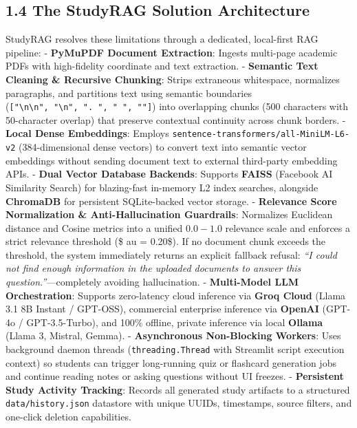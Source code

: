 \documentclass[
]{article}
\begin{document}
\subsection{1.4 The StudyRAG Solution
Architecture}\label{the-studyrag-solution-architecture}

StudyRAG resolves these limitations through a dedicated, local-first RAG
pipeline: - \textbf{PyMuPDF Document Extraction}: Ingests multi-page
academic PDFs with high-fidelity coordinate and text extraction. -
\textbf{Semantic Text Cleaning \& Recursive Chunking}: Strips extraneous
whitespace, normalizes paragraphs, and partitions text using semantic
boundaries
(\texttt{{[}"\textbackslash{}n\textbackslash{}n",\allowbreak \ \allowbreak "\textbackslash{}n",\allowbreak \ \allowbreak ".\ \allowbreak ",\allowbreak \ \allowbreak "\ \allowbreak ",\allowbreak \ \allowbreak ""{]}})
into overlapping chunks (500 characters with 50-character overlap) that
preserve contextual continuity across chunk borders. - \textbf{Local
Dense Embeddings}: Employs
\texttt{sentence-transformers/\allowbreak all-MiniLM-L6-v2} (384-dimensional dense
vectors) to convert text into semantic vector embeddings without sending
document text to external third-party embedding APIs. - \textbf{Dual
Vector Database Backends}: Supports \textbf{FAISS} (Facebook AI
Similarity Search) for blazing-fast in-memory L2 index searches,
alongside \textbf{ChromaDB} for persistent SQLite-backed vector storage.
- \textbf{Relevance Score Normalization \& Anti-Hallucination
Guardrails}: Normalizes Euclidean distance and Cosine metrics into a
unified \(0.0 - 1.0\) relevance scale and enforces a strict relevance
threshold (\$ au = 0.20\$). If no document chunk exceeds the threshold,
the system immediately returns an explicit fallback refusal: \emph{``I
could not find enough information in the uploaded documents to answer
this question.''}---completely avoiding hallucination. -
\textbf{Multi-Model LLM Orchestration}: Supports zero-latency cloud
inference via \textbf{Groq Cloud} (Llama 3.1 8B Instant / GPT-OSS),
commercial enterprise inference via \textbf{OpenAI} (GPT-4o /
GPT-3.5-Turbo), and 100\% offline, private inference via local
\textbf{Ollama} (Llama 3, Mistral, Gemma). - \textbf{Asynchronous
Non-Blocking Workers}: Uses background daemon threads
(\texttt{threading.\allowbreak Thread} with Streamlit script execution context) so
students can trigger long-running quiz or flashcard generation jobs and
continue reading notes or asking questions without UI freezes. -
\textbf{Persistent Study Activity Tracking}: Records all generated study
artifacts to a structured \texttt{data/\allowbreak history.\allowbreak json} datastore with
unique UUIDs, timestamps, source filters, and one-click deletion
capabilities.
\end{document}
